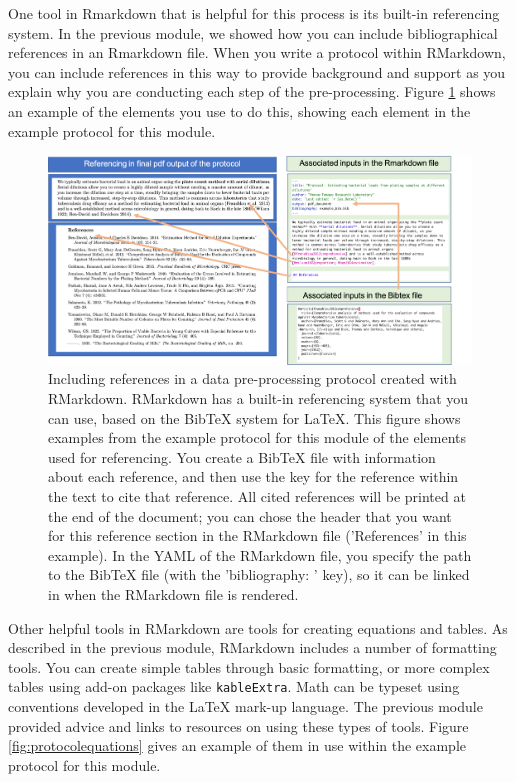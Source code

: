 \documentclass[]{tufte-book}
\begin{document}
One tool in Rmarkdown that is helpful for this process is its built-in
referencing system. In the previous module, we showed how you can include
bibliographical references in an Rmarkdown file. When you write a protocol
within RMarkdown, you can include references in this way to provide background
and support as you explain why you are conducting each step of the
pre-processing. Figure \ref{fig:protocolreferences} shows an example of the
elements you use to do this, showing each element in the example protocol for
this module.

\begin{figure}
\includegraphics[width=\textwidth]{figures/protocol_references} \caption[Including references in a data pre-processing protocol created with RMarkdown]{Including references in a data pre-processing protocol created with RMarkdown. RMarkdown has a built-in referencing system that you can use, based on the BibTeX system for LaTeX. This figure shows examples from the example protocol for this module of the elements used for referencing. You create a BibTeX file with information about each reference, and then use the key for the reference within the text to cite that reference. All cited references will be printed at the end of the document; you can chose the header that you want for this reference section in the RMarkdown file ('References' in this example). In the YAML of the RMarkdown file, you specify the path to the BibTeX file (with the 'bibliography: ' key), so it can be linked in when the RMarkdown file is rendered.}\label{fig:protocolreferences}
\end{figure}

Other helpful tools in RMarkdown are tools for creating equations and tables. As
described in the previous module, RMarkdown includes a number of formatting
tools. You can create simple tables through basic formatting, or more complex
tables using add-on packages like \texttt{kableExtra}. Math can be typeset using
conventions developed in the LaTeX mark-up language. The previous module
provided advice and links to resources on using these types of tools. Figure
\ref{fig:protocolequations} gives an example of them in use within the example
protocol for this module.
\end{document}
